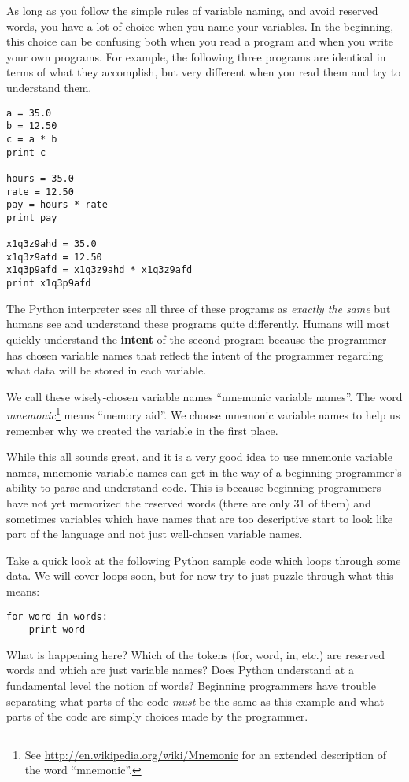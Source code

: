 
As long as you follow the simple rules of variable naming, and avoid
reserved words, you have a lot of choice when you name your variables.
In the beginning, this choice can be confusing both when you read a 
program and when you write your own programs.  For example, the
following three programs are identical in terms of what they accomplish,
but very different when you read them and try to understand them.

\beforeverb
\begin{verbatim}
a = 35.0
b = 12.50
c = a * b
print c

hours = 35.0
rate = 12.50
pay = hours * rate
print pay

x1q3z9ahd = 35.0
x1q3z9afd = 12.50
x1q3p9afd = x1q3z9ahd * x1q3z9afd
print x1q3p9afd
\end{verbatim}
\afterverb
%
The Python interpreter sees all three of these programs as \emph{exactly the 
same} but humans see and understand these programs quite differently.  
Humans will most quickly understand the {\bf intent} 
of the second program because the 
programmer has chosen variable names that reflect the intent of the programmer
regarding what data will be stored in each variable.

We call these wisely-chosen variable names ``mnemonic variable names''.  The
word \emph{mnemonic}\footnote{See 
\url{http://en.wikipedia.org/wiki/Mnemonic}
for an extended description of the word ``mnemonic''.} 
means ``memory aid''.
We choose mnemonic variable names to help us remember why we created the variable
in the first place.

While this all sounds great, and it is a very good idea to use mnemonic variable
names, mnemonic variable names can get in the way of a beginning programmer's 
ability to parse and understand code.  This is because beginning programmers 
have not yet memorized the reserved words (there are only 31 of them) and sometimes
variables which have names that are too descriptive start to look like 
part of the language and not just well-chosen variable names.

Take a quick look at the following Python sample code which loops through some data. 
We will cover loops soon, but for now try to just puzzle through what this means:

\beforeverb
\begin{verbatim}
for word in words:
    print word
\end{verbatim}
\afterverb
%
What is happening here?  Which of the tokens (for, word, in, etc.) are reserved words
and which are just variable names?  Does Python understand at a fundamental level 
the notion of words?  Beginning programmers have 
trouble separating what parts of the
code \emph{must} be the same as this example and what parts of the code are simply
choices made by the programmer.

